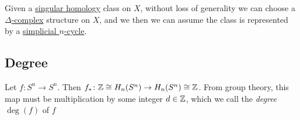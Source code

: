 \begin{corollary}
	Given a \hyperref[def:singular-homology-group]{singular homology} class on \(X\), without loss of generality we can choose a
	\hyperref[def:delta-complex]{\(\Delta \)-complex} structure on \(X\), and we then we can assume the class is represented by a
	\hyperref[def:simplicial-complex]{simplicial $n$-cycle}.
\end{corollary}
\subsection{Degree}
\begin{definition}[Degree]\label{def:degree}
	Let $f \colon S^n \to S^n$. Then $f_\ast \colon \mathbb{\MakeUppercase{z}} \cong H_n(S^n) \to H_n(S^n) \cong \mathbb{\MakeUppercase{z}} $.
	From group theory, this map must be multiplication by some integer $d \in \mathbb{\MakeUppercase{z}} $, which we call the \emph{degree} $\deg(f)$ of $f$
\end{definition}
